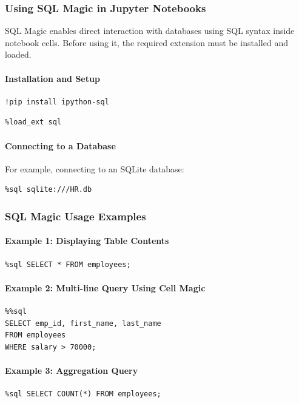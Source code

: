 \documentclass{article}
\begin{document}
\subsubsection{Using SQL Magic in Jupyter Notebooks}

SQL Magic enables direct interaction with databases using SQL syntax inside notebook cells. Before using it, the required extension must be installed and loaded.

\paragraph{Installation and Setup}

\begin{verbatim}
!pip install ipython-sql
\end{verbatim}

\begin{verbatim}
%load_ext sql
\end{verbatim}

\paragraph{Connecting to a Database}

For example, connecting to an SQLite database:
\begin{verbatim}
%sql sqlite:///HR.db
\end{verbatim}

\subsubsection{SQL Magic Usage Examples}

\paragraph{Example 1: Displaying Table Contents}
\begin{verbatim}
%sql SELECT * FROM employees;
\end{verbatim}

\paragraph{Example 2: Multi-line Query Using Cell Magic}
\begin{verbatim}
%%sql
SELECT emp_id, first_name, last_name
FROM employees
WHERE salary > 70000;
\end{verbatim}

\paragraph{Example 3: Aggregation Query}
\begin{verbatim}
%sql SELECT COUNT(*) FROM employees;
\end{verbatim}
\end{document}
